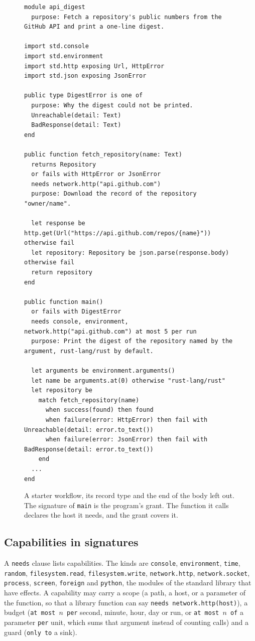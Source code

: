 \documentclass[11pt]{article}
\begin{document}
\begin{figure}[tbp]
\begin{lstlisting}[basicstyle=\footnotesize\ttfamily]
module api_digest
  purpose: Fetch a repository's public numbers from the GitHub API and print a one-line digest.

import std.console
import std.environment
import std.http exposing Url, HttpError
import std.json exposing JsonError

public type DigestError is one of
  purpose: Why the digest could not be printed.
  Unreachable(detail: Text)
  BadResponse(detail: Text)
end

public function fetch_repository(name: Text)
  returns Repository
  or fails with HttpError or JsonError
  needs network.http("api.github.com")
  purpose: Download the record of the repository "owner/name".

  let response be http.get(Url("https://api.github.com/repos/{name}")) otherwise fail
  let repository: Repository be json.parse(response.body) otherwise fail
  return repository
end

public function main()
  or fails with DigestError
  needs console, environment, network.http("api.github.com") at most 5 per run
  purpose: Print the digest of the repository named by the argument, rust-lang/rust by default.

  let arguments be environment.arguments()
  let name be arguments.at(0) otherwise "rust-lang/rust"
  let repository be
    match fetch_repository(name)
      when success(found) then found
      when failure(error: HttpError) then fail with Unreachable(detail: error.to_text())
      when failure(error: JsonError) then fail with BadResponse(detail: error.to_text())
    end
  ...
end
\end{lstlisting}
\caption{A starter workflow, its record type and the end of the body left
out. The signature of \texttt{main} is the program's grant. The function
it calls declares the host it needs, and the grant covers it.}
\label{fig:program}
\end{figure}

\subsection{Capabilities in signatures}
\label{sec:capabilities}

\begin{sloppypar}
A \texttt{needs} clause lists capabilities. The kinds are
\texttt{console}, \texttt{environment}, \texttt{time}, \texttt{random},
\texttt{filesystem.read}, \texttt{filesystem.write},
\texttt{network.http}, \texttt{network.socket}, \texttt{process},
\texttt{screen}, \texttt{foreign} and \texttt{python}, the modules of
the standard library that have effects. A capability may
carry a scope (a path, a host, or a parameter of the function, so that
a library function can say \texttt{needs network.http(host)}), a budget
(\texttt{at most $n$ per} second, minute, hour, day or run, or
\texttt{at most $n$ of} a parameter \texttt{per} unit, which sums that
argument instead of counting calls) and a guard (\texttt{only to} a
sink).
\end{sloppypar}
\end{document}
